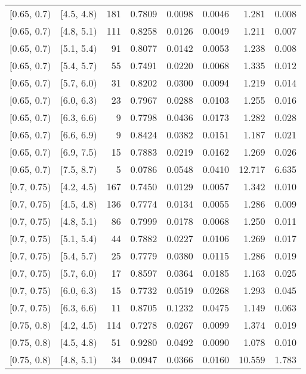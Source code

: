 \begin{longtable}{| l | l | r | r | r | r | r | r |}
        $[$0.65, 0.7$)$ & $[$4.5, 4.8$)$ & 181 & 0.7809 & 0.0098 & 0.0046 & 1.281 & 0.008 \\
        $[$0.65, 0.7$)$ & $[$4.8, 5.1$)$ & 111 & 0.8258 & 0.0126 & 0.0049 & 1.211 & 0.007 \\
        $[$0.65, 0.7$)$ & $[$5.1, 5.4$)$ & 91 & 0.8077 & 0.0142 & 0.0053 & 1.238 & 0.008 \\
        $[$0.65, 0.7$)$ & $[$5.4, 5.7$)$ & 55 & 0.7491 & 0.0220 & 0.0068 & 1.335 & 0.012 \\
        $[$0.65, 0.7$)$ & $[$5.7, 6.0$)$ & 31 & 0.8202 & 0.0300 & 0.0094 & 1.219 & 0.014 \\
        $[$0.65, 0.7$)$ & $[$6.0, 6.3$)$ & 23 & 0.7967 & 0.0288 & 0.0103 & 1.255 & 0.016 \\
        $[$0.65, 0.7$)$ & $[$6.3, 6.6$)$ & 9 & 0.7798 & 0.0436 & 0.0173 & 1.282 & 0.028 \\
        $[$0.65, 0.7$)$ & $[$6.6, 6.9$)$ & 9 & 0.8424 & 0.0382 & 0.0151 & 1.187 & 0.021 \\
        $[$0.65, 0.7$)$ & $[$6.9, 7.5$)$ & 15 & 0.7883 & 0.0219 & 0.0162 & 1.269 & 0.026 \\
        $[$0.65, 0.7$)$ & $[$7.5, 8.7$)$ & 5 & 0.0786 & 0.0548 & 0.0410 & 12.717 & 6.635 \\
        $[$0.7, 0.75$)$ & $[$4.2, 4.5$)$ & 167 & 0.7450 & 0.0129 & 0.0057 & 1.342 & 0.010 \\
        $[$0.7, 0.75$)$ & $[$4.5, 4.8$)$ & 136 & 0.7774 & 0.0134 & 0.0055 & 1.286 & 0.009 \\
        $[$0.7, 0.75$)$ & $[$4.8, 5.1$)$ & 86 & 0.7999 & 0.0178 & 0.0068 & 1.250 & 0.011 \\
        $[$0.7, 0.75$)$ & $[$5.1, 5.4$)$ & 44 & 0.7882 & 0.0227 & 0.0106 & 1.269 & 0.017 \\
        $[$0.7, 0.75$)$ & $[$5.4, 5.7$)$ & 25 & 0.7779 & 0.0380 & 0.0115 & 1.286 & 0.019 \\
        $[$0.7, 0.75$)$ & $[$5.7, 6.0$)$ & 17 & 0.8597 & 0.0364 & 0.0185 & 1.163 & 0.025 \\
        $[$0.7, 0.75$)$ & $[$6.0, 6.3$)$ & 15 & 0.7732 & 0.0519 & 0.0268 & 1.293 & 0.045 \\
        $[$0.7, 0.75$)$ & $[$6.3, 6.6$)$ & 11 & 0.8705 & 0.1232 & 0.0475 & 1.149 & 0.063 \\
        $[$0.75, 0.8$)$ & $[$4.2, 4.5$)$ & 114 & 0.7278 & 0.0267 & 0.0099 & 1.374 & 0.019 \\
        $[$0.75, 0.8$)$ & $[$4.5, 4.8$)$ & 51 & 0.9280 & 0.0492 & 0.0090 & 1.078 & 0.010 \\
        $[$0.75, 0.8$)$ & $[$4.8, 5.1$)$ & 34 & 0.0947 & 0.0366 & 0.0160 & 10.559 & 1.783 \\
\end{longtable}
